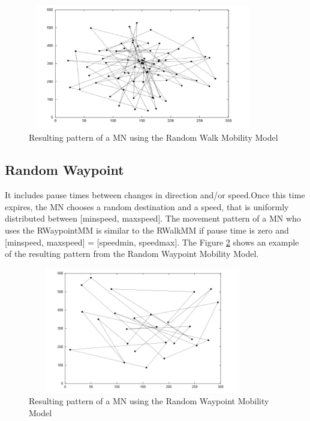 \begin{figure}[h]
\center
\includegraphics[width=10cm,height=55mm]{../images/randomwalk1.png}
\caption{\label{RandomWalkFig}Resulting pattern of a MN using the Random Walk Mobility Model}
\end{figure}

\newpage

\subsection{Random Waypoint}

It includes pause times between changes in direction and/or speed.Once this time expires, the MN chooses a random destination and a speed, that is uniformly distributed between [minspeed, maxspeed]. The movement pattern of a MN who uses the RWaypointMM is similar to the RWalkMM if pause time is zero and [minspeed, maxspeed] = [speedmin, speedmax]. The Figure \ref{RandomWaypointFig} shows an example of the resulting pattern from the Random Waypoint Mobility Model.\\

\begin{figure}[h]
\center
\includegraphics[width=10cm,height=55mm]{../images/randomwaypoint1.png}
\caption{\label{RandomWaypointFig}Resulting pattern of a MN using the Random Waypoint Mobility Model}
\end{figure}

